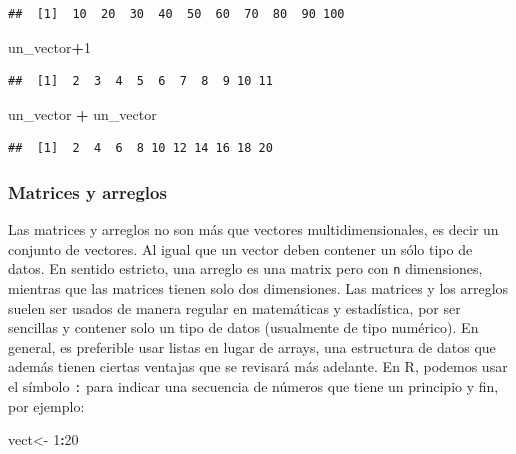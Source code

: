 \documentclass[
]{book}
\newenvironment{Shaded}{\begin{snugshade}}{\end{snugshade}}
\newcommand{\DecValTok}[1]{\textcolor[rgb]{0.00,0.00,0.81}{#1}}
\newcommand{\NormalTok}[1]{#1}
\newcommand{\OtherTok}[1]{\textcolor[rgb]{0.56,0.35,0.01}{#1}}
\newcommand{\SpecialCharTok}[1]{\textcolor[rgb]{0.81,0.36,0.00}{\textbf{#1}}}
\begin{document}
\begin{verbatim}
##  [1]  10  20  30  40  50  60  70  80  90 100
\end{verbatim}

\begin{Shaded}
\begin{Highlighting}[]
\NormalTok{un\_vector}\SpecialCharTok{+}\DecValTok{1}
\end{Highlighting}
\end{Shaded}

\begin{verbatim}
##  [1]  2  3  4  5  6  7  8  9 10 11
\end{verbatim}

\begin{Shaded}
\begin{Highlighting}[]
\NormalTok{un\_vector }\SpecialCharTok{+}\NormalTok{ un\_vector}
\end{Highlighting}
\end{Shaded}

\begin{verbatim}
##  [1]  2  4  6  8 10 12 14 16 18 20
\end{verbatim}

\subsubsection{Matrices y arreglos}\label{matrices-y-arreglos}

Las matrices y arreglos no son más que vectores multidimensionales, es decir un conjunto de vectores.
Al igual que un vector deben contener un sólo tipo de datos.
En sentido estricto, una arreglo es una matrix pero con \texttt{n} dimensiones, mientras que las matrices tienen solo dos dimensiones.
Las matrices y los arreglos suelen ser usados de manera regular en matemáticas y estadística, por ser sencillas y contener solo un tipo de datos (usualmente de tipo numérico).
En general, es preferible usar listas en lugar de arrays, una estructura de datos que además tienen ciertas ventajas que se revisará más adelante.
En R, podemos usar el símbolo \texttt{:} para indicar una secuencia de números que tiene un principio y fin, por ejemplo:

\begin{Shaded}
\begin{Highlighting}[]
\NormalTok{vect}\OtherTok{\textless{}{-}} \DecValTok{1}\SpecialCharTok{:}\DecValTok{20}
\end{Highlighting}
\end{Shaded}
\end{document}
